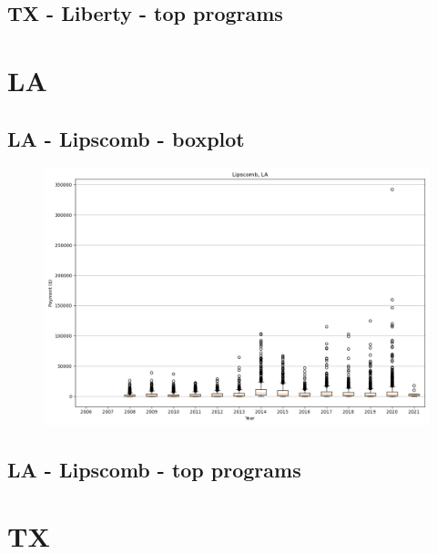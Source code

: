 \subsection*{TX - Liberty - top programs}

\newpage
\section*{LA}
\subsection*{LA - Lipscomb - boxplot}
\begin{figure}[h]
\centering
\includegraphics[width=7in]{../output/boxplots/counties/Lipscomb-LA_boxplot.png}
\end{figure}


\subsection*{LA - Lipscomb - top programs}

\newpage
\section*{TX}
